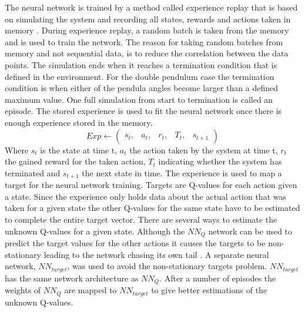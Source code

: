 \documentclass[final]{LTHtwocol} %
\begin{document}
The neural network is trained by a method called experience replay that is based on simulating the system and recording all states, rewards and actions taken in memory \cite{Deep_Q_Learning_First}.
During experience replay, a random batch is taken from the memory and is used to train the network.
The reason for taking random batches from memory and not sequential data, is to reduce the correlation between the data points.
The simulation ends when it reaches a termination condition that is defined in the environment.
For the double pendulum case the termination condition is when either of the pendula angles become larger than a defined maximum value.
One full simulation from start to termination is called an episode.
The stored experience is used to fit the neural network once there is enough experience stored in the memory. 
\begin{equation}
	Exp \leftarrow \begin{pmatrix}s_t, & a_t, & r_t, & T_t, & s_{t+1}	\end{pmatrix}
\end{equation}
Where $s_t$ is the state at time t, $a_t$ the action taken by the system at time t, $r_t$ the gained reward for the taken action, $T_t$ indicating whether the system has terminated and $s_{t+1}$ the next state in time.
The experience is used to map a target for the neural network training.
Targets are Q-values for each action given a state.
Since the experience only holds data about the actual action that was taken for a given state the other Q-values for the same state have to be estimated to complete the entire target vector.
There are several ways to estimate the unknown Q-values for a given state.
Although the $NN_Q$ network can be used to predict the target values for the other actions it causes the targets to be non-stationary leading to the network chasing its own tail \cite{Deep_Q_Learning_Target_Network}.
A separate neural network, $NN_{target}$, was used to avoid the non-stationary targets problem.
$NN_{target}$ has the same network architecture as $NN_Q$.
After a number of episodes the weights of $NN_Q$ are mapped to $NN_{target}$ to give better estimations of the unknown Q-values.
\end{document}
